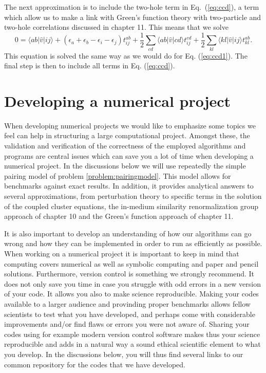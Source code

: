   \noindent
  The next approximation is to include the two-hole term in
  Eq.~(\ref{eq:ccd}), a term which allow us to make a link with
  Green's function theory with two-particle and two-hole
  correlations discussed in chapter 11. This means that we solve
  \begin{equation}
  0 = \langle ab \vert \hat{v} \vert ij \rangle +
  \left(\epsilon_a+\epsilon_b-\epsilon_i-\epsilon_j\right)t_{ij}^{ab}+\frac{1}{2}\sum_{cd}
  \langle ab \vert \hat{v} \vert cd \rangle
  t_{ij}^{cd}+\frac{1}{2}\sum_{kl} \langle kl \vert \hat{v} \vert ij
  \rangle t_{kl}^{ab}.
  \label{eq:ccd2}
  \end{equation}
  This equation is solved the same way as we would do for
  Eq. (\ref{eq:ccd1}). The final step is then to include all terms in
  Eq. (\ref{eq:ccd}).

  \section{Developing a numerical project}

When developing numerical projects we would like to emphasize some
topics we feel can help in structuring a large computational project.
Amongst these, the validation and verification of the correctness of
the employed algorithms and programs are central issues which can
save you a lot of time when developing a numerical project. In the
discussions below we will use repeatedly the simple pairing model of
problem \ref{problem:pairingmodel}.  This model allows for benchmarks
against exact results. In addition, it provides analytical answers to
several approximations, from perturbation theory to specific terms in the solution of the coupled
cluster equations, the in-medium similarity renormalization group
approach of chapter 10 and the Green's function approach of chapter
11. 

It is also important to develop an understanding of how our
algorithms can go wrong and how they can be implemented in order to
run as efficiently as possible. When working on a numerical project it
is important to keep in mind that computing covers numerical as well
as symbolic computing and paper and pencil solutions. Furthermore,
version control is something we strongly recommend. It does not only
save you time in case you struggle with odd errors in a new version of
your code. It allows you also to make science reproducible.  Making
your codes available to a larger audience and provinding proper
benchmarks allows fellow scientists to test what you have developed,
and perhaps come with considerable improvements and/or find flaws
or errors you were not aware of. 
Sharing your codes using for example modern version control
software makes thus your science reproducible and adds in a natural
way a sound ethical scientific element to what you develop.
In the discussions below, you will thus find several links to our 
common repository for the codes that we have developed.


